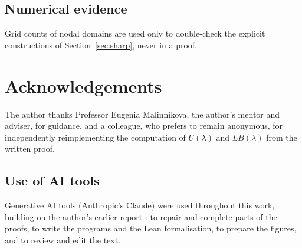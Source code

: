 \documentclass[11pt]{amsart}
\theoremstyle{definition}
\theoremstyle{remark}
\numberwithin{equation}{section}
\begin{document}
\subsection*{Numerical evidence}
Grid counts of nodal domains are used only to double-check the explicit constructions of
Section~\ref{sec:sharp}, never in a proof.

\section*{Acknowledgements}
The author thanks Professor Eugenia Malinnikova, the author's mentor and adviser, for
guidance, and a colleague, who prefers to remain anonymous, for independently
reimplementing the computation of $U(\lambda)$ and $LB(\lambda)$ from the written proof.

\subsection*{Use of AI tools}
Generative AI tools (Anthropic's Claude) were used throughout this work, building on the
author's earlier report \cite{Sanayei21}: to repair and complete parts of the proofs, to write
the programs and the Lean formalisation, to prepare the figures, and to review and edit the
text.



\end{document}
